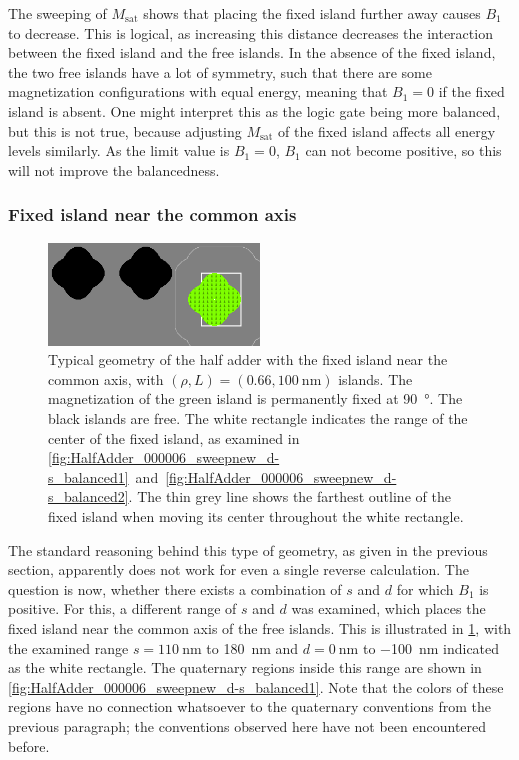 \documentclass[11pt,a4paper,english,twoside]{article}
\begin{document}
The sweeping of $M_\mathrm{sat}$ shows that placing the fixed island further away causes $B_1$ to decrease. This is logical, as increasing this distance decreases the interaction between the fixed island and the free islands. In the absence of the fixed island, the two free islands have a lot of symmetry, such that there are some magnetization configurations with equal energy, meaning that $B_1=0$ if the fixed island is absent. One might interpret this as the logic gate being more balanced, but this is not true,
because adjusting $M_\mathrm{sat}$ of the fixed island affects all energy levels similarly. As the limit value is $B_1=0$, $B_1$ can not become positive, so this will not improve the balancedness.

\subsubsection{Fixed island near the common axis}
\begin{figure}[b!]
    \centering
    \includegraphics[width=0.5\textwidth]{Figures/half_adder/regions000014.png}
    \caption{Typical geometry of the half adder with the fixed island near the common axis, with $(\rho, L) = (0.66, \SI{100}{\nano\metre})$ islands. The magnetization of the green island is permanently fixed at \SI{90}{\degree}. The black islands are free. The white rectangle indicates the range of the center of the fixed island, as examined in \cref{fig:HalfAdder_000006_sweepnew_d-s_balanced1}~and~\ref{fig:HalfAdder_000006_sweepnew_d-s_balanced2}. The thin grey line shows the farthest outline of the fixed island when moving its center throughout the white rectangle.}
    \label{fig:HalfAdder_000006new_geometryTypical}
\end{figure}
The standard reasoning behind this type of geometry, as given in the previous section, apparently does not work for even a single reverse calculation. The question is now, whether there exists a combination of $s$ and $d$ for which $B_1$ is positive. For this, a different range of $s$ and $d$ was examined, which places the fixed island near the common axis of the free islands. This is illustrated in \cref{fig:HalfAdder_000006new_geometryTypical}, with the examined range $s=\SI{110}{\nano\metre}$ to \SI{180}{\nano\metre} and $d=\SI{0}{\nano\metre}$ to \SI{-100}{\nano\metre} indicated as the white rectangle. The quaternary regions inside this range are shown in \cref{fig:HalfAdder_000006_sweepnew_d-s_balanced1}. Note that the colors of these regions have no connection whatsoever to the quaternary conventions from the previous paragraph; the conventions observed here have not been encountered before. \par
\end{document}
